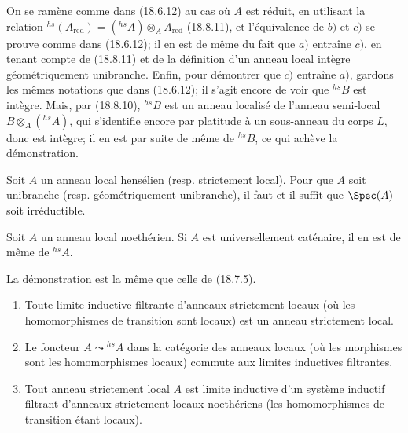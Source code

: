 On se ramène comme dans (18.6.12) au cas où $A$ est réduit, en utilisant la relation ${}^{hs}(A_{\mathrm{red}})=({}^{hs}\!A)\otimes_A A_{\mathrm{red}}$ (18.8.11), et l'équivalence de $b)$ et $c)$ se prouve comme dans (18.6.12); il en est de même du fait que $a)$ entraîne $c)$, en tenant compte de (18.8.11) et de la définition d'un anneau local intègre géométriquement unibranche. Enfin, pour démontrer que $c)$ entraîne $a)$, gardons les mêmes notations que dans (18.6.12); il s'agit encore de voir que ${}^{hs}\!B$ est intègre. Mais, par (18.8.10), ${}^{hs}\!B$ est un anneau localisé de l'anneau semi-local $B\otimes_A({}^{hs}\!A)$, qui s'identifie encore par platitude à un sous-anneau du corps $L$, donc est intègre; il en est par suite de même de ${}^{hs}\!B$, ce qui achève la démonstration.

\begin{corollary}[18.8.16]
\label{IV.18.8.16}
Soit $A$ un anneau local hensélien (resp. strictement local). Pour que $A$ soit unibranche (resp. géométriquement unibranche), il faut et il suffit que $\Spec(A)$ soit irréductible.
\end{corollary}


\begin{proposition}[18.8.17]
\label{IV.18.8.17}
Soit $A$ un anneau local noethérien. Si $A$ est universellement caténaire, il en est de même de ${}^{hs}\!A$.
\end{proposition}

La démonstration est la même que celle de (18.7.5).

\begin{proposition}[18.8.18]
\label{IV.18.8.18}
\begin{enumerate}
  \item[(i)] Toute limite inductive filtrante d'anneaux strictement locaux (où les homomorphismes de transition sont locaux) est un anneau strictement local.
  \item[(ii)] Le foncteur $A\leadsto{}^{hs}\!A$ dans la catégorie des anneaux locaux (où les morphismes sont les homomorphismes locaux) commute aux limites inductives filtrantes.
  \item[(iii)] Tout anneau strictement local $A$ est limite inductive d'un système inductif filtrant d'anneaux strictement locaux noethériens (les homomorphismes de transition étant locaux).
\end{enumerate}
\end{proposition}

